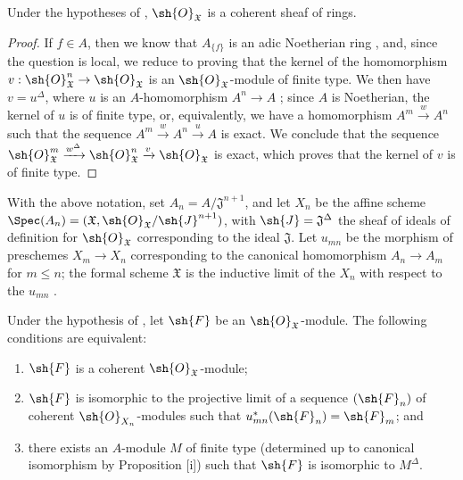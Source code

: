 \begin{proposition}[10.10.3]
\label{I.10.10.3}
Under the hypotheses of , $\sh{O}_\mathfrak{X}$ is a coherent sheaf of rings.
\end{proposition}

\begin{proof}
If $f\in A$, then we know that $A_{\{f\}}$ is an adic Noetherian ring , and, since the question is local, we reduce  to proving that the kernel of the homomorphism $v:\sh{O}_\mathfrak{X}^n\to\sh{O}_\mathfrak{X}$ is an $\sh{O}_\mathfrak{X}$-module of finite type.
We then have $v=u^\Delta$, where $u$ is an $A$-homomorphism $A^n\to A$ ; since $A$ is Noetherian, the kernel of $u$ is of finite type, or, equivalently, we have a homomorphism $A^m\xrightarrow{w}A^n$ such that the sequence $A^m\xrightarrow{w}A^n\xrightarrow{u}A$ is exact.
We conclude  that the sequence $\sh{O}_\mathfrak{X}^m\xrightarrow{w^\Delta}\sh{O}_\mathfrak{X}^n\xrightarrow{v}\sh{O}_\mathfrak{X}$ is exact, which proves that the kernel of $v$ is of finite type.
\end{proof}

\begin{env}[10.10.4]
\label{I.10.10.4}
With the above notation, set $A_n=A/\mathfrak{J}^{n+1}$, and let $X_n$ be the affine scheme $\Spec(A_n)=(\mathfrak{X},\sh{O}_\mathfrak{X}/\sh{J}^{n+1})$, with $\sh{J}=\mathfrak{J}^\Delta$ the sheaf of ideals of definition for $\sh{O}_\mathfrak{X}$ corresponding to the ideal $\mathfrak{J}$.
Let $u_{mn}$ be the morphism of preschemes $X_m\to X_n$ corresponding to the canonical homomorphism $A_n\to A_m$ for $m\leq n$; the formal scheme $\mathfrak{X}$ is the inductive limit of the $X_n$ with respect to the $u_{mn}$ .
\end{env}

\begin{proposition}[10.10.5]
\label{I.10.10.5}
Under the hypothesis of , let $\sh{F}$ be an $\sh{O}_\mathfrak{X}$-module.
The following conditions are equivalent:
\begin{enumerate}
  \item[\rm{(a)}] $\sh{F}$ is a coherent $\sh{O}_\mathfrak{X}$-module;
  \item[\rm{(b)}] $\sh{F}$ is isomorphic to the projective limit  of a sequence $(\sh{F}_n)$ of coherent $\sh{O}_{X_n}$-modules such that $u_{mn}^*(\sh{F}_n)=\sh{F}_m$; and
  \item[\rm{(c)}] there exists an $A$-module $M$ of finite type (determined up to canonical isomorphism by Proposition [i]) such that $\sh{F}$ is isomorphic to $M^\Delta$.
\end{enumerate}
\end{proposition}

